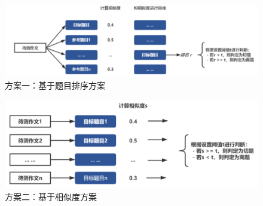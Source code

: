 \documentclass[11pt]{article}
\begin{document}
\begin{CJK}{UTF8}{gkai}
\begin{figure}[htbp]\small
  \centering
  \includegraphics[width=0.8\linewidth]{fangan01.png}
  \caption{方案一：基于题目排序方案}
  \label{framework}
\end{figure}

\begin{figure}[htbp]\small
  \centering
  \includegraphics[width=0.8\linewidth]{fangan02.png}
  \caption{方案二：基于相似度方案}
  \label{framework}
\end{figure}


\end{CJK}
\end{document}
